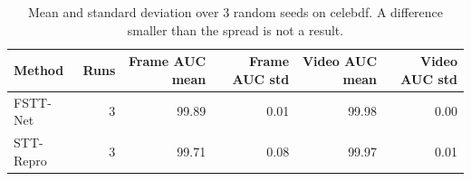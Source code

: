 \begin{table}[!t]
\centering
\caption{Mean and standard deviation over 3 random seeds on celebdf. A difference smaller than the spread is not a result.}
\label{tab:tableXII_seed_variance}
\footnotesize
\begin{tabular}{lrrrrr}
\hline\hline
Method & Runs & Frame AUC mean & Frame AUC std & Video AUC mean & Video AUC std \\
\hline
FSTT-Net & 3 & 99.89 & 0.01 & 99.98 & 0.00 \\
STT-Repro & 3 & 99.71 & 0.08 & 99.97 & 0.01 \\
\hline\hline
\end{tabular}
\end{table}
